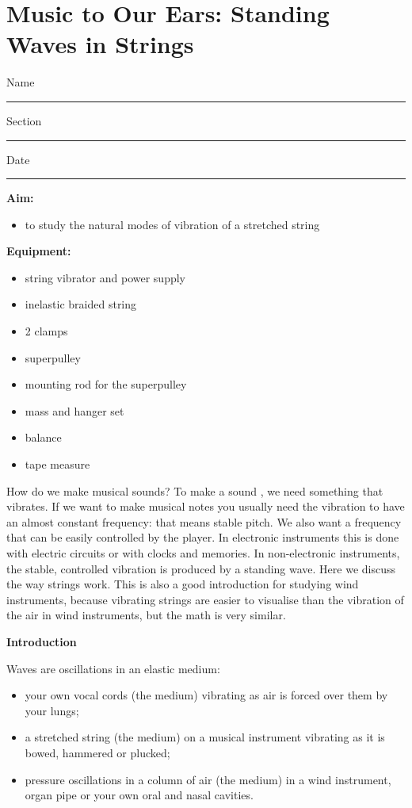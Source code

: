 \section{Music to Our Ears: Standing Waves in Strings}

Name \rule{2.0in}{0.1pt}\hfill{}Section \rule{1.0in}{0.1pt}\hfill{}Date
\rule{1.0in}{0.1pt}

\textbf{Aim:}
\begin{itemize}
\item  to study the natural modes of vibration of a stretched string
\end{itemize}

\textbf{Equipment:}
\begin{itemize}
\item  string vibrator and power supply
\item  inelastic braided string
\item  2 clamps
\item  superpulley
\item  mounting rod for the superpulley
\item  mass and hanger set
\item  balance
\item  tape measure
\end{itemize}


How do we make musical sounds? To make a sound , we need something that vibrates. If we want to make musical notes you usually need the vibration to have an almost constant frequency: that means stable pitch. We also want a frequency that can be easily controlled by the player. In electronic instruments this is done with electric circuits or with clocks and memories. In non-electronic instruments, the stable, controlled vibration is produced by a standing wave. Here we discuss the way strings work. This is also a good introduction for studying wind instruments, because vibrating strings are easier to visualise than the vibration of the air in wind instruments, but the math is very similar.  

\textbf{Introduction}

Waves are oscillations in an elastic medium:

\begin{itemize}
\item  your own vocal cords (the medium) vibrating as air is forced over them by your lungs; 
\item  a stretched string (the medium) on a musical instrument vibrating as it is bowed, hammered or plucked; 
\item  pressure oscillations in a column of air (the medium) in a wind instrument, organ pipe or your own oral and nasal cavities.
\end{itemize}

